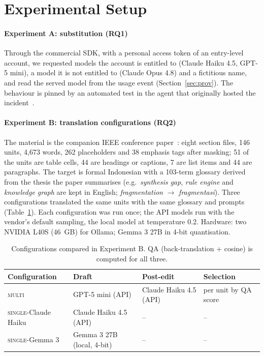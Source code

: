 \section{Experimental Setup}
\label{sec:setup}

\paragraph{Experiment A: substitution (RQ1)}
Through the commercial SDK, with a personal access token of an entry-level account, we requested models the account is entitled to (Claude Haiku 4.5, GPT-5 mini), a model it is not entitled to (Claude Opus 4.8) and a fictitious name, and read the served model from the usage event (Section~\ref{sec:prov}). The behaviour is pinned by an automated test in the agent that originally hosted the incident~\cite{arya2026wizard}.

\paragraph{Experiment B: translation configurations (RQ2)}
The material is the companion IEEE conference paper~\cite{arya2026wizard}: eight section files, 146 units, 4{,}673 words, 262 placeholders and 38 emphasis tags after masking; 51 of the units are table cells, 44 are headings or captions, 7 are list items and 44 are paragraphs. The target is formal Indonesian with a 103-term glossary derived from the thesis the paper summarises (e.g.\ \emph{synthesis gap}, \emph{rule engine} and \emph{knowledge graph} are kept in English; \emph{fragmentation} $\rightarrow$ \emph{fragmentasi}). Three configurations translated the same units with the same glossary and prompts (Table~\ref{tab:configs}). Each configuration was run once; the API models run with the vendor's default sampling, the local model at temperature $0.2$. Hardware: two NVIDIA L40S (46~GB) for Ollama; Gemma 3 27B in 4-bit quantisation.

\begin{table}[t]
  \caption{Configurations compared in Experiment B. QA (back-translation + cosine) is computed for all three.}
  \label{tab:configs}
  \centering
  \footnotesize
  \setlength{\tabcolsep}{3pt}
  \begin{tabular}{@{}lp{1.75cm}p{1.95cm}p{1.6cm}@{}}
    \toprule
    Configuration & Draft & Post-edit & Selection \\
    \midrule
    \textsc{multi} & GPT-5 mini (API) & Claude Haiku 4.5 (API) & per unit by QA score \\
    \textsc{single}-Claude Haiku & Claude Haiku 4.5 (API) & -- & -- \\
    \textsc{single}-Gemma 3 & Gemma 3 27B (local, 4-bit) & -- & -- \\
    \bottomrule
  \end{tabular}
\end{table}


